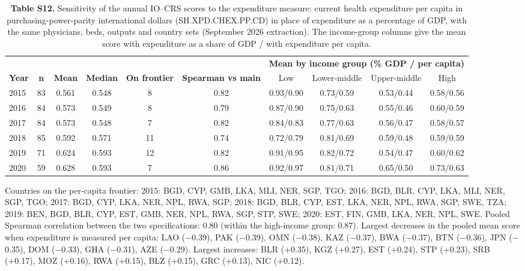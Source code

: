 \documentclass[11pt,letterpaper]{article}
\begin{document}
\begin{table}[htbp]
\footnotesize
\setlength{\tabcolsep}{4pt}
\caption{\textbf{Table S12.} Sensitivity of the annual IO--CRS scores to the expenditure measure: current health expenditure per capita in purchasing-power-parity international dollars (SH.XPD.CHEX.PP.CD) in place of expenditure as a percentage of GDP, with the same physicians, beds, outputs and country sets (September 2026 extraction). The income-group columns give the mean score with expenditure as a share of GDP / with expenditure per capita.}
\begin{tabular}{@{}lccccc cccc@{}}
\toprule
& & & & & & \multicolumn{4}{c}{\textbf{Mean by income group (\% GDP / per capita)}} \\
\cmidrule(lr){7-10}
\textbf{Year} & \textbf{n} & \textbf{Mean} & \textbf{Median} & \textbf{On frontier} & \textbf{Spearman vs main} & Low & Lower-middle & Upper-middle & High \\
\midrule
2015 & 83 & 0.561 & 0.548 & 8 & 0.82 & 0.93/0.90 & 0.73/0.59 & 0.53/0.44 & 0.58/0.56 \\
2016 & 84 & 0.573 & 0.549 & 8 & 0.79 & 0.87/0.90 & 0.75/0.63 & 0.55/0.46 & 0.60/0.59 \\
2017 & 84 & 0.573 & 0.548 & 7 & 0.82 & 0.84/0.83 & 0.77/0.63 & 0.56/0.47 & 0.58/0.57 \\
2018 & 85 & 0.592 & 0.571 & 11 & 0.74 & 0.72/0.79 & 0.81/0.69 & 0.59/0.48 & 0.59/0.59 \\
2019 & 71 & 0.624 & 0.593 & 12 & 0.82 & 0.91/0.95 & 0.82/0.72 & 0.54/0.47 & 0.60/0.62 \\
2020 & 59 & 0.628 & 0.593 & 7 & 0.86 & 0.92/0.97 & 0.81/0.71 & 0.65/0.50 & 0.73/0.63 \\
\bottomrule
\end{tabular}

\vspace{4pt}
{\footnotesize Countries on the per-capita frontier: 2015: BGD, CYP, GMB, LKA, MLI, NER, SGP, TGO; 2016: BGD, BLR, CYP, LKA, MLI, NER, SGP, TGO; 2017: BGD, CYP, LKA, NER, NPL, RWA, SGP; 2018: BGD, BLR, CYP, EST, LKA, NER, NPL, RWA, SGP, SWE, TZA; 2019: BEN, BGD, BLR, CYP, EST, GMB, NER, NPL, RWA, SGP, STP, SWE; 2020: EST, FIN, GMB, LKA, NER, NPL, SWE. Pooled Spearman correlation between the two specifications: 0.80 (within the high-income group: 0.87). Largest decreases in the pooled mean score when expenditure is measured per capita: LAO ($-$0.39), PAK ($-$0.39), OMN ($-$0.38), KAZ ($-$0.37), BWA ($-$0.37), BTN ($-$0.36), JPN ($-$0.35), DOM ($-$0.33), GHA ($-$0.31), AZE ($-$0.29). Largest increases: BLR (+0.35), KGZ (+0.27), EST (+0.24), STP (+0.23), SRB (+0.17), MOZ (+0.16), RWA (+0.15), BLZ (+0.15), GRC (+0.13), NIC (+0.12).}
\end{table}
\end{document}
